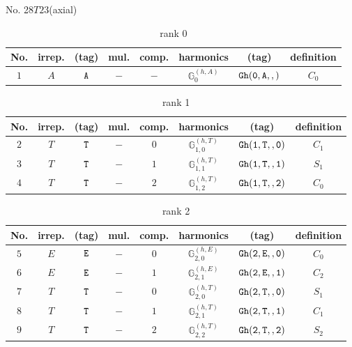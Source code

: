 \documentclass[fleqn,8pt]{jsarticle}
\begin{document}
\setcounter{MaxMatrixCols}{16}

\begin{center}
\LARGE
No. 28\quad$T$\quad$23$\quad[ cubic ] (axial)
\end{center}
\begin{table}[ht!]
\begin{center}
\caption{rank 0}
\renewcommand{\arraystretch}{1.3}
\begin{tabular}{cccccccc} \hline \hline
No. & irrep. & (tag) & mul. & comp. & harmonics & (tag) & definition \\ \hline
$ 1 $ & $ A $ & $ {\tt A} $ & $ - $ & $ - $ & $ \mathbb{G}_{0}^{(h,A)} $ & $ {\tt Gh(0,A,,)} $ & $ C_{0} $ \\
 \hline \hline
\end{tabular}
\end{center}
\end{table}
\begin{table}[ht!]
\begin{center}
\caption{rank 1}
\renewcommand{\arraystretch}{1.3}
\begin{tabular}{cccccccc} \hline \hline
No. & irrep. & (tag) & mul. & comp. & harmonics & (tag) & definition \\ \hline
$ 2 $ & $ T $ & $ {\tt T} $ & $ - $ & $ 0 $ & $ \mathbb{G}_{1,0}^{(h,T)} $ & $ {\tt Gh(1,T,,0)} $ & $ C_{1} $ \\
$ 3 $ & $ T $ & $ {\tt T} $ & $ - $ & $ 1 $ & $ \mathbb{G}_{1,1}^{(h,T)} $ & $ {\tt Gh(1,T,,1)} $ & $ S_{1} $ \\
$ 4 $ & $ T $ & $ {\tt T} $ & $ - $ & $ 2 $ & $ \mathbb{G}_{1,2}^{(h,T)} $ & $ {\tt Gh(1,T,,2)} $ & $ C_{0} $ \\
 \hline \hline
\end{tabular}
\end{center}
\end{table}
\begin{table}[ht!]
\begin{center}
\caption{rank 2}
\renewcommand{\arraystretch}{1.3}
\begin{tabular}{cccccccc} \hline \hline
No. & irrep. & (tag) & mul. & comp. & harmonics & (tag) & definition \\ \hline
$ 5 $ & $ E $ & $ {\tt E} $ & $ - $ & $ 0 $ & $ \mathbb{G}_{2,0}^{(h,E)} $ & $ {\tt Gh(2,E,,0)} $ & $ C_{0} $ \\
$ 6 $ & $ E $ & $ {\tt E} $ & $ - $ & $ 1 $ & $ \mathbb{G}_{2,1}^{(h,E)} $ & $ {\tt Gh(2,E,,1)} $ & $ C_{2} $ \\
$ 7 $ & $ T $ & $ {\tt T} $ & $ - $ & $ 0 $ & $ \mathbb{G}_{2,0}^{(h,T)} $ & $ {\tt Gh(2,T,,0)} $ & $ S_{1} $ \\
$ 8 $ & $ T $ & $ {\tt T} $ & $ - $ & $ 1 $ & $ \mathbb{G}_{2,1}^{(h,T)} $ & $ {\tt Gh(2,T,,1)} $ & $ C_{1} $ \\
$ 9 $ & $ T $ & $ {\tt T} $ & $ - $ & $ 2 $ & $ \mathbb{G}_{2,2}^{(h,T)} $ & $ {\tt Gh(2,T,,2)} $ & $ S_{2} $ \\
 \hline \hline
\end{tabular}
\end{center}
\end{table}
\end{document}
